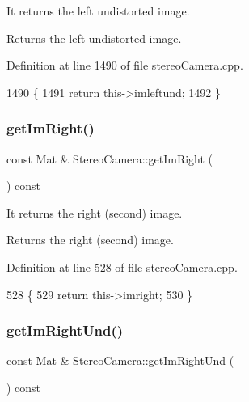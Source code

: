 It returns the left undistorted image. 

\begin{DoxyReturn}{Returns}
the left undistorted image. 
\end{DoxyReturn}


Definition at line 1490 of file stereo\+Camera.\+cpp.


\begin{DoxyCode}
1490                                             \{
1491     \textcolor{keywordflow}{return} this->imleftund;
1492 \}
\end{DoxyCode}
\mbox{\label{classStereoCamera_ac7930aa4fa0681246e74c08cf4b1079b}} 
\subsubsection{\texorpdfstring{get\+Im\+Right()}{getImRight()}}
{\footnotesize\ttfamily const Mat \& Stereo\+Camera\+::get\+Im\+Right (\begin{DoxyParamCaption}{ }\end{DoxyParamCaption}) const}



It returns the right (second) image. 

\begin{DoxyReturn}{Returns}
the right (second) image. 
\end{DoxyReturn}


Definition at line 528 of file stereo\+Camera.\+cpp.


\begin{DoxyCode}
528                                           \{
529     \textcolor{keywordflow}{return} this->imright;
530 \}
\end{DoxyCode}
\mbox{\label{classStereoCamera_a19009c20003a5c7e957a4b3c34913fe9}} 
\subsubsection{\texorpdfstring{get\+Im\+Right\+Und()}{getImRightUnd()}}
{\footnotesize\ttfamily const Mat \& Stereo\+Camera\+::get\+Im\+Right\+Und (\begin{DoxyParamCaption}{ }\end{DoxyParamCaption}) const}



